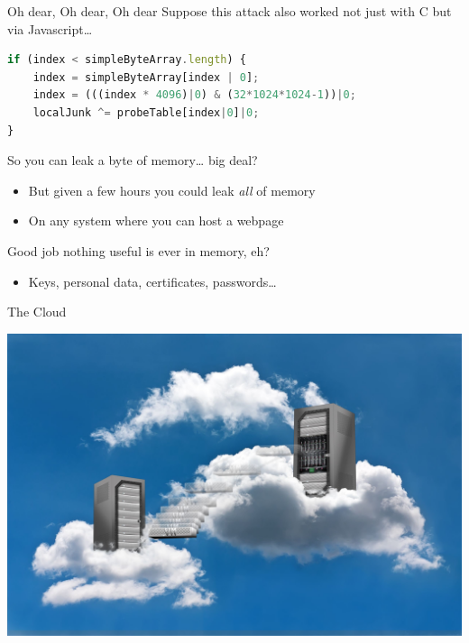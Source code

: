 \documentclass[9pt,aspectratio=169]{beamer}
\begin{document}
\begin{frame}[label={sec:org10a47b8},fragile]{Oh dear, Oh dear, Oh dear}
 Suppose this attack also worked not just with C but via Javascript\ldots{}

\begin{lstlisting}[language=js,numbers=none]
if (index < simpleByteArray.length) {
    index = simpleByteArray[index | 0];
    index = (((index * 4096)|0) & (32*1024*1024-1))|0;
    localJunk ^= probeTable[index|0]|0;
}
\end{lstlisting}

So you can leak a byte of memory\ldots{} big deal?
\begin{itemize}
\item But given a few hours you could leak \emph{all} of memory
\item On any system where you can host a webpage
\end{itemize}

\begin{block}{Good job nothing useful is ever in memory, eh?}
\begin{itemize}
\item Keys, personal data, certificates, passwords\ldots{}
\end{itemize}
\end{block}
\end{frame}


\begin{frame}[label={sec:org2a20f5f}]{The Cloud}
\begin{center}
\includegraphics[width=\linewidth]{./cloud.jpg}
\end{center}
\end{frame}
\end{document}
